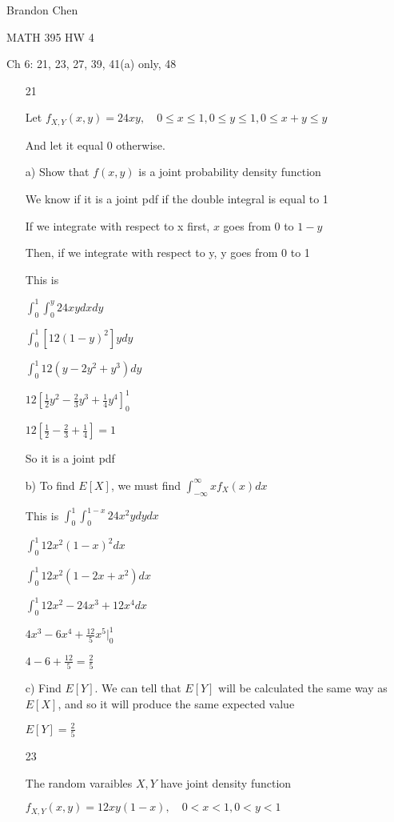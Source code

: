 \documentclass[11pt]{article}
\begin{document}
\noindent Brandon Chen

\noindent MATH 395 HW 4

\noindent Ch 6:  21, 23, 27, 39, 41(a) only, 48

\begin{itemize}

\item[21]

Let $f_{X,Y}(x,y) = 24xy, \quad 0 \leq x \leq 1, 0\leq y \leq 1, 0 \leq x + y \leq y$

And let it equal 0 otherwise.

a) Show that $f(x,y)$ is a joint probability density function

We know if it is a joint pdf if the double integral is equal to 1

If we integrate with respect to x first, $x$ goes from 0 to $1-y$

Then, if we integrate with respect to y, y goes from 0 to 1

This is

$\int_0^1 \int_0^y 24xy dxdy$

$\int_0^1 [12(1-y)^2]ydy$

$\int_0^1 12(y - 2y^2 + y^3)dy$

$12[\frac{1}{2}y^2 - \frac{2}{3}y^3 + \frac{1}{4}y^4]_0^1$

$12[\frac{1}{2} - \frac{2}{3} + \frac{1}{4}] = 1$

So it is a joint pdf

b) To find $E[X]$, we must find $\int_{-\infty}^{\infty} x f_X(x) dx$

This is $\int_0^1 \int_0^{1-x} 24x^2y dydx$

$\int_0^1 12x^2(1-x)^2 dx$

$\int_0^1 12x^2(1 - 2x + x^2) dx$

$\int_0^1 12x^2 - 24x^3 + 12x^4 dx$

$4x^3 - 6x^4 + \frac{12}{5}x^5|_0^1$

$4 - 6 + \frac{12}{5} = \frac{2}{5}$

c) Find $E[Y]$. We can tell that $E[Y]$ will be calculated the same way as $E[X]$, and so it will produce the same expected value

$E[Y] = \frac{2}{5}$

\item[23]

The random varaibles $X,Y$ have joint density function

$f_{X,Y}(x,y) = 12xy(1-x), \quad 0 < x < 1,  0 < y < 1$


\end{itemize}
\end{document}
